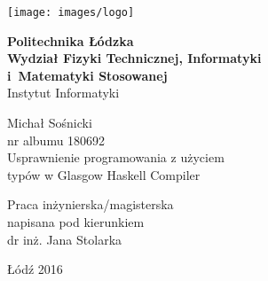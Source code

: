 \begin{titlepage}

\noindent
\begin{minipage}{0.19\textwidth}
\begin{flushleft}
\texttt{[image: images/logo]}
\end{flushleft}
\end{minipage}
\begin{minipage}[t][][t]{0.81\textwidth}
\begin{flushleft}
\vspace{-2\baselineskip}
\textbf{{\large Politechnika Łódzka}\\}
\vspace{\medskipamount}
\textbf{\large Wydział Fizyki Technicznej, Informatyki\\i~Matematyki Stosowanej}
\vspace{\medskipamount}\\
{\large Instytut Informatyki}\\
\end{flushleft}
\end{minipage}
\vspace{2.5cm}

\begin{center}
{\Large Michał Sośnicki\\nr albumu 180692\\}
\vspace{2cm}
{\huge Usprawnienie programowania z użyciem\\typów w Glasgow Haskell Compiler}
\end{center}
\vspace{3cm}
\hfill
\begin{minipage}{.55\columnwidth}
Praca inżynierska/magisterska\\
napisana pod kierunkiem\\
dr inż. Jana Stolarka
\end{minipage}
\vfill
\begin{center}
Łódź 2016
\end{center}
\end{titlepage}
